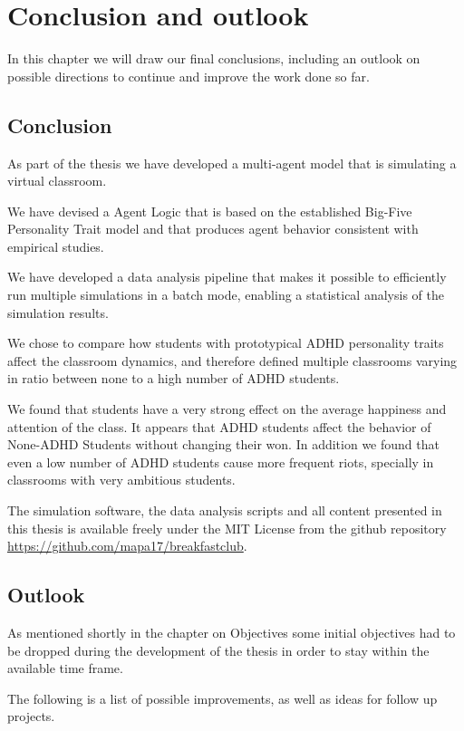 \chapter{Conclusion and outlook}
In this chapter we will draw our final conclusions, including an outlook on
possible directions to continue and improve the work done so far.

\section{Conclusion}
As part of the thesis we have developed a multi-agent model that is simulating a virtual classroom.

We have devised a Agent Logic that is based on the established Big-Five Personality
Trait model and that produces agent behavior consistent with empirical studies.

We have developed a data analysis pipeline that makes it possible to efficiently
run multiple simulations in a batch mode, enabling a statistical analysis of the
simulation results.

We chose to compare how students with prototypical ADHD personality traits affect
the classroom dynamics, and therefore defined multiple classrooms varying in 
ratio between none to a high number of ADHD students.

We found that students have a very strong effect on the average happiness and attention
of the class. It appears that ADHD students affect the behavior of None-ADHD Students
without changing their won. In addition we found that even a low number of
ADHD students cause more frequent riots, specially in classrooms with very
ambitious students.

The simulation software, the data analysis scripts and all content presented in this
thesis is available freely under the MIT License from the github repository
\href{https://github.com/mapa17/breakfastclub}{https://github.com/mapa17/breakfastclub}.

\section{Outlook}
As mentioned shortly in the chapter on Objectives some initial objectives had to
be dropped during the development of the thesis in order to stay within the available
time frame.

The following is a list of possible improvements, as well as ideas for follow up projects.

